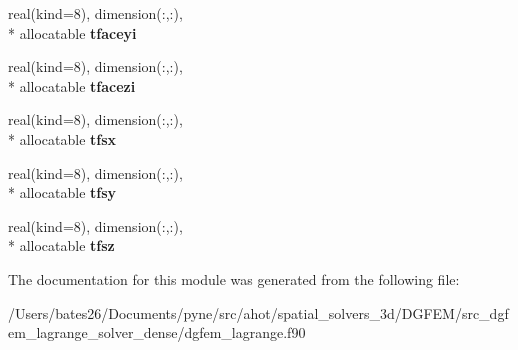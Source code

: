 \begin{DoxyCompactItemize}
\item 
\hypertarget{classdgfem__lagrange_ad9aea6402d5e36164ae41e9526c17825}{real(kind=8), dimension(\+:,\+:), \\*
allocatable {\bfseries tfaceyi}}\label{classdgfem__lagrange_ad9aea6402d5e36164ae41e9526c17825}

\item 
\hypertarget{classdgfem__lagrange_a2aff66b06931f934592c47c07a67f78d}{real(kind=8), dimension(\+:,\+:), \\*
allocatable {\bfseries tfacezi}}\label{classdgfem__lagrange_a2aff66b06931f934592c47c07a67f78d}

\item 
\hypertarget{classdgfem__lagrange_afd3cf4c173e4b04e2038b2e7cb6e9f23}{real(kind=8), dimension(\+:,\+:), \\*
allocatable {\bfseries tfsx}}\label{classdgfem__lagrange_afd3cf4c173e4b04e2038b2e7cb6e9f23}

\item 
\hypertarget{classdgfem__lagrange_a3227176b19511ae90db3ee5b93cd1da2}{real(kind=8), dimension(\+:,\+:), \\*
allocatable {\bfseries tfsy}}\label{classdgfem__lagrange_a3227176b19511ae90db3ee5b93cd1da2}

\item 
\hypertarget{classdgfem__lagrange_ae4bc228f094f616277477f9a733b05ca}{real(kind=8), dimension(\+:,\+:), \\*
allocatable {\bfseries tfsz}}\label{classdgfem__lagrange_ae4bc228f094f616277477f9a733b05ca}

\end{DoxyCompactItemize}


The documentation for this module was generated from the following file\+:\begin{DoxyCompactItemize}
\item 
/\+Users/bates26/\+Documents/pyne/src/ahot/spatial\+\_\+solvers\+\_\+3d/\+D\+G\+F\+E\+M/src\+\_\+dgfem\+\_\+lagrange\+\_\+solver\+\_\+dense/dgfem\+\_\+lagrange.\+f90\end{DoxyCompactItemize}
